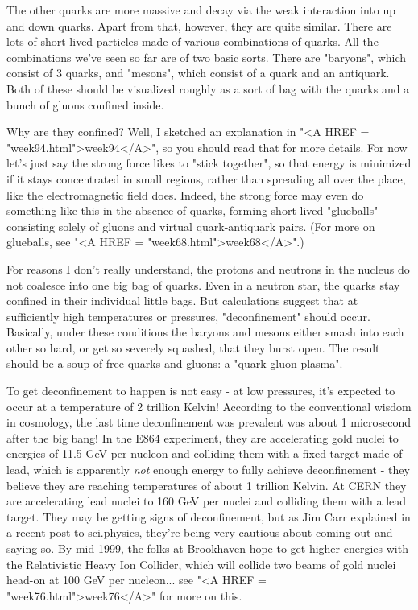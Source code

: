 The other quarks are more massive and decay via the weak interaction
into up and down quarks.  Apart from that, however, they are quite
similar.  There are lots of short-lived particles made of various
combinations of quarks.  All the combinations we've seen so far are of
two basic sorts.  There are "baryons", which consist of 3 quarks, and
"mesons", which consist of a quark and an antiquark.  Both of these
should be visualized roughly as a sort of bag with the quarks and a
bunch of gluons confined inside.

Why are they confined?  Well, I sketched an explanation in "<A HREF = "week94.html">week94</A>", so
you should read that for more details.  For now let's just say the
strong force likes to "stick together", so that energy is minimized if
it stays concentrated in small regions, rather than spreading all over
the place, like the electromagnetic field does.  Indeed, the strong
force may even do something like this in the absence of quarks, forming
short-lived "glueballs" consisting solely of gluons and virtual
quark-antiquark pairs.  (For more on glueballs, see "<A HREF = "week68.html">week68</A>".)

For reasons I don't really understand, the protons and neutrons in the
nucleus do not coalesce into one big bag of quarks.  Even in a neutron
star, the quarks stay confined in their individual little bags.  But
calculations suggest that at sufficiently high temperatures or
pressures, "deconfinement" should occur.  Basically, under these
conditions the baryons and mesons either smash into each other so hard,
or get so severely squashed, that they burst open.  The result should be
a soup of free quarks and gluons: a "quark-gluon plasma".

To get deconfinement to happen is not easy - at low pressures, it's 
expected to occur at a temperature of 2 trillion Kelvin!  According
to the conventional wisdom in cosmology, the last time deconfinement 
was prevalent was about 1 microsecond after the big bang!  In the E864 
experiment, they are accelerating gold nuclei to energies of 11.5 GeV 
per nucleon and colliding them with a fixed target made of lead, which 
is apparently \emph{not} enough energy to fully achieve deconfinement - they
believe they are reaching temperatures of about 1 trillion Kelvin.  
At CERN they are accelerating lead nuclei to 160 GeV per nuclei 
and colliding them with a lead target.  They may be getting signs of 
deconfinement, but as Jim Carr explained in a recent post to sci.physics, 
they're being very cautious about coming out and saying so.  By mid-1999, 
the folks at Brookhaven hope to get higher energies with the Relativistic 
Heavy Ion Collider, which will collide two beams of gold nuclei head-on 
at 100 GeV per nucleon... see "<A HREF = "week76.html">week76</A>" for more on this.

